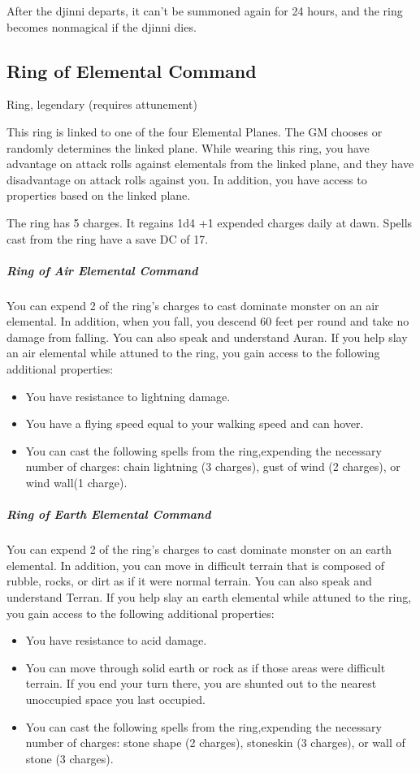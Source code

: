 After the djinni departs, it can't be summoned again for 24 hours, and the ring becomes nonmagical if the djinni dies.

\subsection{Ring of Elemental Command}
Ring, legendary (requires attunement)

This ring is linked to one of the four Elemental Planes. The GM chooses or randomly determines the linked plane.
While wearing this ring, you have advantage on attack rolls against elementals from the linked plane, and they have disadvantage on attack rolls against you. In addition, you have access to properties based on the linked plane.

The ring has 5 charges. It regains 1d4 +1 expended charges daily at dawn. Spells cast from the ring have a save DC of 17.

\subparagraph*{Ring of Air Elemental Command} You can expend 2 of the ring's charges to cast dominate monster on an air elemental. In addition, when you fall, you descend 60 feet per round and take no damage from falling. You can also speak and understand Auran.
If you help slay an air elemental while attuned to the ring, you gain access to the following additional properties:
\begin{itemize}
\item You have resistance to lightning damage.
\item You have a flying speed equal to your walking speed and can hover.
\item You can cast the following spells from the ring,expending the necessary number of charges: chain lightning (3 charges), gust of wind (2 charges), or wind wall(1 charge).
\end{itemize}

\subparagraph*{Ring of Earth Elemental Command} You can expend 2 of the ring's charges to cast dominate monster on an earth elemental. In addition, you can move in difficult terrain that is composed of rubble, rocks, or dirt as if it were normal terrain. You can also speak and understand Terran.  If you help slay an earth elemental while attuned to the ring, you gain access to the following additional properties:
\begin{itemize}
\item You have resistance to acid damage.
\item You can move through solid earth or rock as if those areas were difficult terrain. If you end your turn there, you are shunted out to the nearest unoccupied space you last occupied.
\item You can cast the following spells from the ring,expending the necessary number of charges: stone shape (2 charges), stoneskin (3 charges), or wall of stone (3 charges).
\end{itemize}

